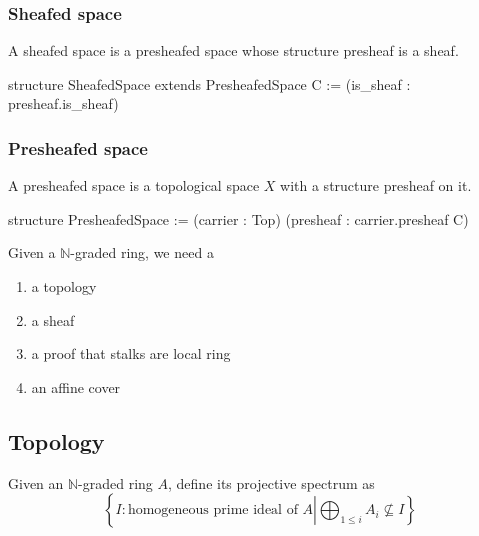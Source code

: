 \documentclass[11pt]{article}
\newenvironment{Shaded}{}{}
\newcommand{\NormalTok}[1]{{#1}}
\begin{document}
    \hypertarget{sheafed-space}{%
\subsubsection{Sheafed space}\label{sheafed-space}}

A sheafed space is a presheafed space whose structure presheaf is a
sheaf.

\begin{Shaded}
\begin{Highlighting}[]
\NormalTok{structure SheafedSpace extends PresheafedSpace C :=}
\NormalTok{(is\_sheaf : presheaf.is\_sheaf)}
\end{Highlighting}
\end{Shaded}

    \hypertarget{presheafed-space}{%
\subsubsection{Presheafed space}\label{presheafed-space}}

A presheafed space is a topological space \(X\) with a structure
presheaf on it.

\begin{Shaded}
\begin{Highlighting}[]
\NormalTok{structure PresheafedSpace :=}
\NormalTok{(carrier : Top)}
\NormalTok{(presheaf : carrier.presheaf C)}
\end{Highlighting}
\end{Shaded}

    Given a \(\mathbb N\)-graded ring, we need a

\begin{enumerate}
\def\labelenumi{\arabic{enumi}.}
\item
  a topology
\item
  a sheaf
\item
  a proof that stalks are local ring
\item
  an affine cover
\end{enumerate}

    \hypertarget{topology}{%
\subsection{Topology}\label{topology}}

    Given an \(\mathbb N\)-graded ring \(A\), define its projective spectrum
as \[
\left\{I : \text{homogeneous prime ideal of } A\left| \bigoplus_{1\le i}A_i\not\subseteq I\right.\right\}
\]
\end{document}
